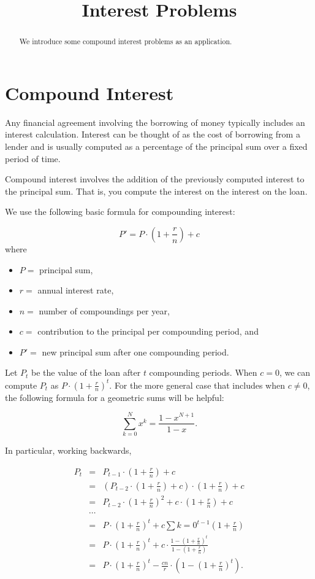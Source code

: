 \documentclass{ximera}
\title{Interest Problems}
\begin{document}
\begin{abstract}  
We introduce some compound interest problems as an application.
\end{abstract}  
\maketitle

\section{Compound Interest}

Any financial agreement involving the borrowing of money typically includes an interest calculation. Interest can be thought of as the cost of borrowing from a lender and is usually computed as a percentage of the principal sum over a fixed period of time.

Compound interest involves the addition of the previously computed interest to the principal sum. That is, you compute the interest on the interest on the loan.

We use the following basic formula for compounding interest:

$$P' = P\cdot\left(1+\frac{r}{n}\right) + c $$ where
\begin{itemize}
	\item $P = $ principal sum,
	\item $r = $ annual interest rate,
	\item $n = $ number of compoundings per year,
	\item $c = $ contribution to the principal per compounding period, and 
	\item $P' = $ new principal sum after one compounding period.
\end{itemize}

Let $P_t$ be the value of the loan after $t$ compounding periods. When $c=0$, we can compute $P_t$ as $P\cdot\left(1+\frac{r}{n}\right)^{t}$. For the more general case that includes when $c\neq 0$, the following formula for a geometric sums will be helpful:

$$\sum_{k=0}^Nx^k = \frac{1-x^{N+1}}{1-x}.$$

In particular, working backwards, 

\begin{align*}
	P_t & = & P_{t-1}\cdot\left(1+\frac{r}{n}\right) + c\\
	    & = & (P_{t-2}\cdot\left(1+\frac{r}{n}\right) + c)\cdot\left(1+\frac{r}{n}\right) + c\\
	    & = & P_{t-2}\cdot\left(1+\frac{r}{n}\right)^2 + c\cdot\left(1+\frac{r}{n}\right) + c\\
	    & \cdots & \\
	    & = & P\cdot\left(1+\frac{r}{n}\right)^t + c\sum{k=0}^{t-1}\left(1+\frac{r}{n}\right)\\
	    & = & P\cdot\left(1+\frac{r}{n}\right)^t + c\cdot\frac{1-\left(1+\frac{r}{n}\right)^t}{1-\left(1+\frac{r}{n}\right)}\\
	    & = & P\cdot\left(1+\frac{r}{n}\right)^t - \frac{cn}{r}\cdot\left(1-\left(1+\frac{r}{n}\right)^t\right).
\end{align*}
\end{document}
